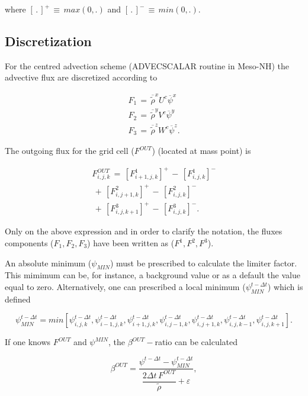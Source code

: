 \noindent where $[\,.\,]^{+}\,\equiv\, max(0,.)$ and $[\,.\,]^{-}\,\equiv\,min(0,.)$.

\subsection{Discretization}

For the centred advection scheme (ADVECSCALAR routine in Meso-NH) the advective
flux are discretized according to

\begin{eqnarray}
F_1\,=\,
\overline{\tilde{\rho}}^{x}U^{c} \overline{\psi}^{x} \\
F_2\,=\,
\overline{\tilde{\rho}}^{y}V^{c} \overline{\psi}^{y} \\
F_3\,=\,
\overline{\tilde{\rho}}^{z}W^{c} \overline{\psi}^{z}.
\end{eqnarray}

The outgoing flux for the grid cell ($F^{OUT}$) (located at mass point) is

\begin{eqnarray}
F^{OUT}_{i,j,k}\,=\,[F^1_{i+1,j,k}]^+\,-\,[F^1_{i,j,k}]^-
\nonumber \\
\,+\,[F^2_{i,j+1,k}]^+\,-\,[F^2_{i,j,k}]^-
\nonumber \\
\,+\,[F^3_{i,j,k+1}]^+\,-\,[F^3_{i,j,k}]^-.
\end{eqnarray}

Only on the above expression and in order to clarify the notation, the fluxes
components ($F_1,F_2,F_3$) have been written as ($F^1,F^2,F^3$).

An absolute minimum ($\psi_{MIN}$) must be prescribed to calculate the limiter factor.
This mimimum can be, for instance, a
background value or as a default the value equal to zero.
Alternatively, one can prescribed a local minimum ($\psi_{MIN}^{t-\Delta {t}}$)
which is defined

\begin{equation}
\psi_{MIN}^{t-\Delta {t}}=
min[\psi^{t-\Delta {t}}_{i,j,k},
\psi^{t-\Delta {t}}_{i-1,j,k}, \psi^{t-\Delta {t}}_{i+1,j,k},
\psi^{t-\Delta {t}}_{i,j-1,k}, \psi^{t-\Delta {t}}_{i,j+1,k},
\psi^{t-\Delta {t}}_{i,j,k-1}, \psi^{t-\Delta {t}}_{i,j,k+1}].
\end{equation}

If one knows $F^{OUT}$ and $\psi^{MIN}$, the $\beta^{OUT}-$ratio
can be calculated

\begin{equation}
\beta^{OUT}=
 \dfrac{ \psi^{t-\Delta {t}}- \psi_{MIN}^{t-\Delta {t}}   }
{\dfrac{ {2 \Delta t} \, {F}^{OUT}}{\tilde{\rho}} +\varepsilon },
\end{equation}

